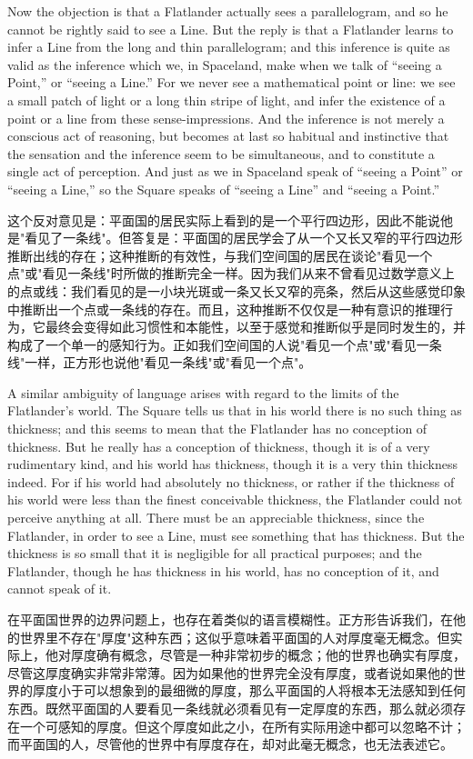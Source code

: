 \documentclass[12pt,UTF8]{ctexbook}
\begin{document}
Now the objection is that a Flatlander actually sees a parallelogram, and so he cannot be rightly said to see a Line. But the reply is that a Flatlander learns to infer a Line from the long and thin parallelogram; and this inference is quite as valid as the inference which we, in Spaceland, make when we talk of ``seeing a Point,'' or ``seeing a Line.'' For we never see a mathematical point or line: we see a small patch of light or a long thin stripe of light, and infer the existence of a point or a line from these sense-impressions. And the inference is not merely a conscious act of reasoning, but becomes at last so habitual and instinctive that the sensation and the inference seem to be simultaneous, and to constitute a single act of perception. And just as we in Spaceland speak of ``seeing a Point'' or ``seeing a Line,'' so the Square speaks of ``seeing a Line'' and ``seeing a Point.''

这个反对意见是：平面国的居民实际上看到的是一个平行四边形，因此不能说他是"看见了一条线"。但答复是：平面国的居民学会了从一个又长又窄的平行四边形推断出线的存在；这种推断的有效性，与我们空间国的居民在谈论"看见一个点"或"看见一条线"时所做的推断完全一样。因为我们从来不曾看见过数学意义上的点或线：我们看见的是一小块光斑或一条又长又窄的亮条，然后从这些感觉印象中推断出一个点或一条线的存在。而且，这种推断不仅仅是一种有意识的推理行为，它最终会变得如此习惯性和本能性，以至于感觉和推断似乎是同时发生的，并构成了一个单一的感知行为。正如我们空间国的人说"看见一个点"或"看见一条线"一样，正方形也说他"看见一条线"或"看见一个点"。

A similar ambiguity of language arises with regard to the limits of the Flatlander's world. The Square tells us that in his world there is no such thing as thickness; and this seems to mean that the Flatlander has no conception of thickness. But he really has a conception of thickness, though it is of a very rudimentary kind, and his world has thickness, though it is a very thin thickness indeed. For if his world had absolutely no thickness, or rather if the thickness of his world were less than the finest conceivable thickness, the Flatlander could not perceive anything at all. There must be an appreciable thickness, since the Flatlander, in order to see a Line, must see something that has thickness. But the thickness is so small that it is negligible for all practical purposes; and the Flatlander, though he has thickness in his world, has no conception of it, and cannot speak of it.

在平面国世界的边界问题上，也存在着类似的语言模糊性。正方形告诉我们，在他的世界里不存在"厚度"这种东西；这似乎意味着平面国的人对厚度毫无概念。但实际上，他对厚度确有概念，尽管是一种非常初步的概念；他的世界也确实有厚度，尽管这厚度确实非常非常薄。因为如果他的世界完全没有厚度，或者说如果他的世界的厚度小于可以想象到的最细微的厚度，那么平面国的人将根本无法感知到任何东西。既然平面国的人要看见一条线就必须看见有一定厚度的东西，那么就必须存在一个可感知的厚度。但这个厚度如此之小，在所有实际用途中都可以忽略不计；而平面国的人，尽管他的世界中有厚度存在，却对此毫无概念，也无法表述它。
\end{document}
